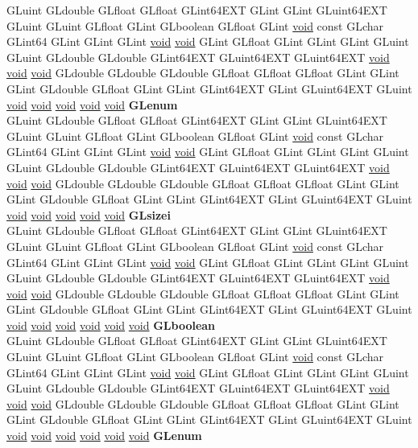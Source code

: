 \begin{DoxyCompactItemize}
\begin{tabbing}
\>GLuint GLdouble GLfloat GLfloat GLint64EXT GLint GLint GLuint64EXT GLuint GLuint GLfloat GLint GLboolean GLfloat GLint \hyperlink{interfacevoid}{void} const GLchar GLint64 GLint GLint GLint \hyperlink{interfacevoid}{void} \hyperlink{interfacevoid}{void} GLint GLfloat GLint GLint GLint GLuint GLuint GLdouble GLdouble GLint64EXT GLuint64EXT GLuint64EXT \hyperlink{interfacevoid}{void} \hyperlink{interfacevoid}{void} \hyperlink{interfacevoid}{void} GLdouble GLdouble GLdouble GLfloat GLfloat GLfloat GLint GLint GLint GLdouble GLfloat GLint GLint GLint64EXT GLint GLuint64EXT GLuint \hyperlink{interfacevoid}{void} \hyperlink{interfacevoid}{void} \hyperlink{interfacevoid}{void} \hyperlink{interfacevoid}{void} \hyperlink{interfacevoid}{void} {\bfseries GLenum}\\
\>GLuint GLdouble GLfloat GLfloat GLint64EXT GLint GLint GLuint64EXT GLuint GLuint GLfloat GLint GLboolean GLfloat GLint \hyperlink{interfacevoid}{void} const GLchar GLint64 GLint GLint GLint \hyperlink{interfacevoid}{void} \hyperlink{interfacevoid}{void} GLint GLfloat GLint GLint GLint GLuint GLuint GLdouble GLdouble GLint64EXT GLuint64EXT GLuint64EXT \hyperlink{interfacevoid}{void} \hyperlink{interfacevoid}{void} \hyperlink{interfacevoid}{void} GLdouble GLdouble GLdouble GLfloat GLfloat GLfloat GLint GLint GLint GLdouble GLfloat GLint GLint GLint64EXT GLint GLuint64EXT GLuint \hyperlink{interfacevoid}{void} \hyperlink{interfacevoid}{void} \hyperlink{interfacevoid}{void} \hyperlink{interfacevoid}{void} \hyperlink{interfacevoid}{void} {\bfseries GLsizei}\\
\>GLuint GLdouble GLfloat GLfloat GLint64EXT GLint GLint GLuint64EXT GLuint GLuint GLfloat GLint GLboolean GLfloat GLint \hyperlink{interfacevoid}{void} const GLchar GLint64 GLint GLint GLint \hyperlink{interfacevoid}{void} \hyperlink{interfacevoid}{void} GLint GLfloat GLint GLint GLint GLuint GLuint GLdouble GLdouble GLint64EXT GLuint64EXT GLuint64EXT \hyperlink{interfacevoid}{void} \hyperlink{interfacevoid}{void} \hyperlink{interfacevoid}{void} GLdouble GLdouble GLdouble GLfloat GLfloat GLfloat GLint GLint GLint GLdouble GLfloat GLint GLint GLint64EXT GLint GLuint64EXT GLuint \hyperlink{interfacevoid}{void} \hyperlink{interfacevoid}{void} \hyperlink{interfacevoid}{void} \hyperlink{interfacevoid}{void} \hyperlink{interfacevoid}{void} \hyperlink{interfacevoid}{void} {\bfseries GLboolean}\\
\>GLuint GLdouble GLfloat GLfloat GLint64EXT GLint GLint GLuint64EXT GLuint GLuint GLfloat GLint GLboolean GLfloat GLint \hyperlink{interfacevoid}{void} const GLchar GLint64 GLint GLint GLint \hyperlink{interfacevoid}{void} \hyperlink{interfacevoid}{void} GLint GLfloat GLint GLint GLint GLuint GLuint GLdouble GLdouble GLint64EXT GLuint64EXT GLuint64EXT \hyperlink{interfacevoid}{void} \hyperlink{interfacevoid}{void} \hyperlink{interfacevoid}{void} GLdouble GLdouble GLdouble GLfloat GLfloat GLfloat GLint GLint GLint GLdouble GLfloat GLint GLint GLint64EXT GLint GLuint64EXT GLuint \hyperlink{interfacevoid}{void} \hyperlink{interfacevoid}{void} \hyperlink{interfacevoid}{void} \hyperlink{interfacevoid}{void} \hyperlink{interfacevoid}{void} \hyperlink{interfacevoid}{void} {\bfseries GLenum}\\

\end{tabbing}
\end{DoxyCompactItemize}
